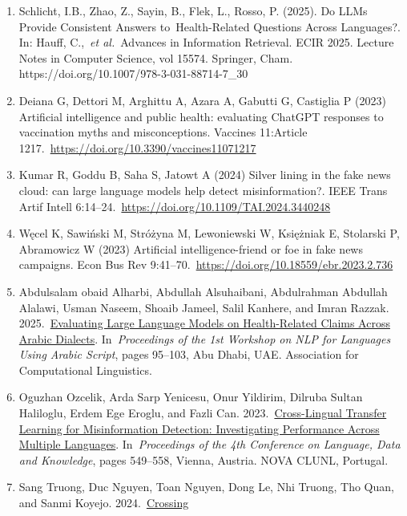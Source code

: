 \documentclass[]{article}
\begin{document}
\begin{enumerate}
  Proceedings of the ACM Web Conference 2024 (WWW ).
  Association for Computing Machinery, New York, NY, USA, 2627--2638.
  \url{https://doi.org/10.1145/3589334.3645643}
\item
  Schlicht, I.B., Zhao, Z., Sayin, B., Flek, L., Rosso, P. (2025). Do
  LLMs Provide Consistent Answers to~Health-Related Questions Across
  Languages?. In: Hauff, C.,~\emph{et al.}~Advances in Information
  Retrieval. ECIR 2025. Lecture Notes in Computer Science, vol 15574.
  Springer, Cham. https://doi.org/10.1007/978-3-031-88714-7\_30
\item
  Deiana G, Dettori M, Arghittu A, Azara A, Gabutti G, Castiglia P
  (2023) Artificial intelligence and public health: evaluating ChatGPT
  responses to vaccination myths and misconceptions. Vaccines 11:Article
  1217.~\url{https://doi.org/10.3390/vaccines11071217}
\item
  Kumar R, Goddu B, Saha S, Jatowt A (2024) Silver lining in the fake
  news cloud: can large language models help detect misinformation?.
  IEEE Trans Artif Intell
  6:14--24.~\url{https://doi.org/10.1109/TAI.2024.3440248}
\item
  Węcel K, Sawiński M, Stróżyna M, Lewoniewski W, Księżniak E, Stolarski
  P, Abramowicz W (2023) Artificial intelligence-friend or foe in fake
  news campaigns. Econ Bus Rev
  9:41--70.~\url{https://doi.org/10.18559/ebr.2023.2.736}
\item
  Abdulsalam obaid Alharbi, Abdullah Alsuhaibani, Abdulrahman Abdullah
  Alalawi, Usman Naseem, Shoaib Jameel, Salil Kanhere, and Imran Razzak.
  2025.~\href{https://aclanthology.org/2025.abjadnlp-1.11/}{Evaluating
  Large Language Models on Health-Related Claims Across Arabic
  Dialects}. In~\emph{Proceedings of the 1st Workshop on NLP for
  Languages Using Arabic Script}, pages 95--103, Abu Dhabi, UAE.
  Association for Computational Linguistics.
\item
  Oguzhan Ozcelik, Arda Sarp Yenicesu, Onur Yildirim, Dilruba Sultan
  Haliloglu, Erdem Ege Eroglu, and Fazli Can.
  2023.~\href{https://aclanthology.org/2023.ldk-1.59/}{Cross-Lingual
  Transfer Learning for Misinformation Detection: Investigating
  Performance Across Multiple Languages}. In~\emph{Proceedings of the
  4th Conference on Language, Data and Knowledge}, pages 549--558,
  Vienna, Austria. NOVA CLUNL, Portugal.
\item
  Sang Truong, Duc Nguyen, Toan Nguyen, Dong Le, Nhi Truong, Tho Quan,
  and Sanmi Koyejo.
  2024.~\href{https://aclanthology.org/2024.findings-naacl.182/}{Crossing
}
\end{enumerate}
\end{document}
